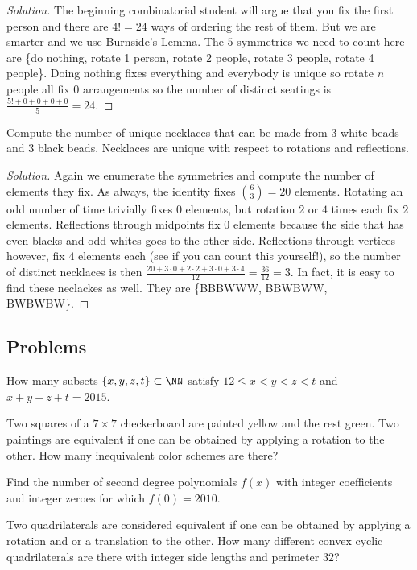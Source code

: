 \documentclass{article}
\begin{document}
\begin{proof}[Solution]
The beginning combinatorial student will argue that you fix the first
person and there are $4! = 24$ ways of ordering the rest of them. But we
are smarter and we use Burnside's Lemma. The $5$ symmetries we need to
count here are \{do nothing, rotate 1 person, rotate 2 people, rotate 3
people, rotate 4 people\}. Doing nothing fixes everything and everybody
is unique so rotate $n$ people all fix $0$ arrangements so the number of
distinct seatings is $\frac{5! + 0 + 0 + 0 + 0}{5} = 24$.
\end{proof}

\begin{ex}
Compute the number of unique necklaces that can be made from $3$ white
beads and $3$ black beads. Necklaces are unique with respect to
rotations and reflections.
\end{ex}

\begin{proof}[Solution]
Again we enumerate the symmetries and compute the number of elements
they fix. As always, the identity fixes $\binom{6}{3} = 20$ elements.
Rotating an odd number of time trivially fixes $0$ elements, but
rotation $2$ or $4$ times each fix $2$ elements. Reflections through
midpoints fix $0$ elements because the side that has even blacks and odd
whites goes to the other side. Reflections through vertices however, fix
$4$ elements each (see if you can count this yourself!), so the number
of distinct necklaces is then $\frac{20 + 3 \cdot 0 + 2 \cdot 2 + 3
\cdot 0 + 3 \cdot 4}{12} = \frac{36}{12} = 3$. In fact, it is easy to
find these neclackes as well. They are \{BBBWWW, BBWBWW, BWBWBW\}.
\end{proof}

\subsection{Problems}

\begin{prb}
How many subsets $\lbrace x, y, z, t \rbrace \subset \NN$ satisfy $12
\leq x < y < z < t$ and $x + y + z + t = 2015$.
\end{prb}

\begin{prb}[1996 AIME]
Two squares of a $7 \times 7$ checkerboard are painted yellow and the
rest green. Two paintings are equivalent if one can be obtained by
applying a rotation to the other. How many inequivalent color schemes
are there?
\end{prb}

\begin{prb}[2010 AIME II-10]
Find the number of second degree polynomials $f(x)$ with integer
coefficients and integer zeroes for which $f(0) = 2010$.
\end{prb}

\begin{prb}[2010 AMC 12A-25]
Two quadrilaterals are considered equivalent if one can be obtained by
applying a rotation and or a translation to the other. How many
different convex cyclic quadrilaterals are there with integer side
lengths and perimeter $32$?
\end{prb}
\end{document}
